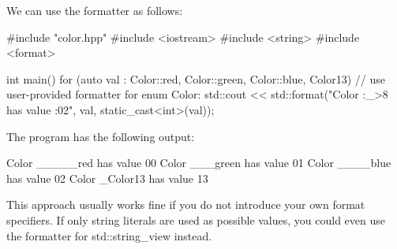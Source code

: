 We can use the formatter as follows:


\begin{cpp}
#include "color.hpp"
#include <iostream>
#include <string>
#include <format>

int main()
{
	for (auto val : {Color::red, Color::green, Color::blue, Color{13}}) {
		// use user-provided formatter for enum Color:
		std::cout << std::format("Color {:_>8} has value {:02}\n",
								  val, static_cast<int>(val));
	}
}
\end{cpp}

The program has the following output:

\begin{shell}
Color _____red has value 00
Color ___green has value 01
Color ____blue has value 02
Color _Color13 has value 13
\end{shell}

This approach usually works fine if you do not introduce your own format specifiers. If only string literals are used as possible values, you could even use the formatter for std::string\_view instead.




